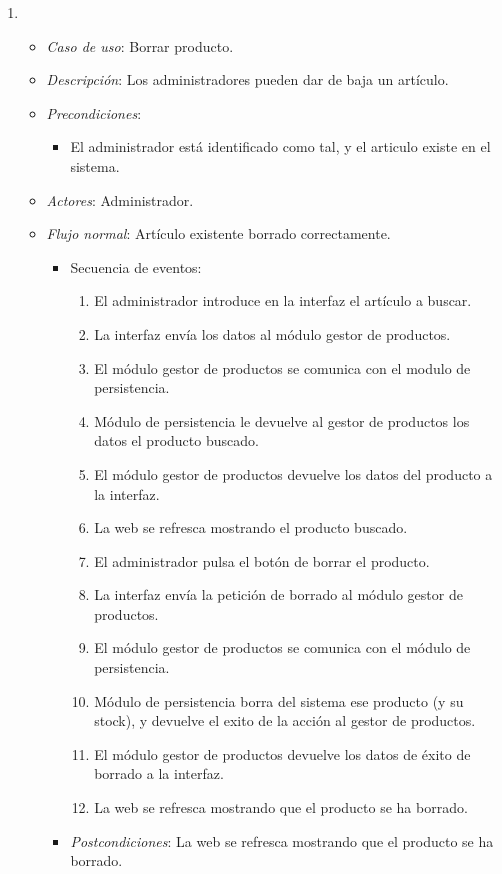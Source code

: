 \begin{enumerate}[{\bf UC-1}]
\begin{itemize}
  \end{itemize}
\item 
  \begin{itemize}
  \item {\it Caso de uso}: Borrar producto.
  \item {\it Descripción}: Los administradores pueden dar de baja un artículo.
  \item {\it Precondiciones}: 
    \begin{itemize}
    \item El administrador está identificado como tal, y el articulo existe en el sistema.
    \end{itemize}
  
  \item {\it Actores}: Administrador.

  \item {\it Flujo normal}: Artículo existente borrado correctamente.
\begin{itemize}
\item Secuencia de eventos:
    \begin{enumerate}[1. ]
    \item El administrador introduce en la interfaz el artículo a buscar.
    \item La interfaz envía los datos al módulo gestor de productos.
    \item El módulo gestor de productos se comunica con el modulo de persistencia.
    \item Módulo de persistencia le devuelve al gestor de productos los datos el producto buscado.
    \item El módulo gestor de productos devuelve los datos del producto a la interfaz.
    \item La web se refresca mostrando el producto buscado.
    \item El administrador pulsa el botón de borrar el producto.
    \item La interfaz envía la petición de borrado al módulo gestor de productos.
    \item El módulo gestor de productos se comunica con el módulo de persistencia.
    \item Módulo de persistencia borra del sistema ese producto (y su stock), y devuelve el exito de la acción al gestor de productos.
    \item El módulo gestor de productos devuelve los datos de éxito de borrado a la interfaz.
    \item La web se refresca mostrando que el producto se ha borrado.
    \end{enumerate}
\item {\it Postcondiciones}: La web se refresca mostrando que el producto se ha borrado.
\end{itemize}


\end{itemize}
\end{enumerate}
